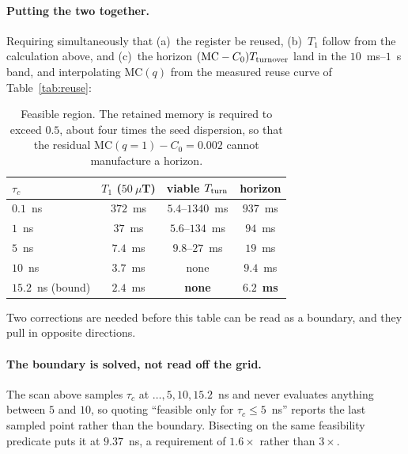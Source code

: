 \documentclass[aps,prx,reprint,superscriptaddress,nofootinbib,floatfix]{revtex4-2}
\begin{document}
\paragraph*{Putting the two together.}
Requiring simultaneously that (a)~the register be reused, (b)~$T_1$ follow from
the calculation above, and (c)~the horizon $(\mathrm{MC}-C_0)T_{\rm turnover}$
land in the $10$~ms--$1$~s band, and interpolating $\mathrm{MC}(q)$ from the
measured reuse curve of Table~\ref{tab:reuse}:

\begin{table}[H]
\caption{\label{tab:feasible}Feasible region. The retained memory is required to
exceed $0.5$, about four times the seed dispersion, so that the residual
$\mathrm{MC}(q{=}1)-C_0=0.002$ cannot manufacture a horizon.}
\begin{ruledtabular}
\begin{tabular}{lccc}
$\tau_c$ & $T_1$ ($50~\mu$T) & viable $T_{\rm turn}$ & horizon \\
\hline
$0.1$~ns & $372$~ms & $5.4$--$1340$~ms & $937$~ms \\
$1$~ns & $37$~ms & $5.6$--$134$~ms & $94$~ms \\
$5$~ns & $7.4$~ms & $9.8$--$27$~ms & $19$~ms \\
$10$~ns & $3.7$~ms & none & $9.4$~ms \\
$15.2$~ns (bound) & $2.4$~ms & \textbf{none} & $\mathbf{6.2}$~\textbf{ms} \\
\end{tabular}
\end{ruledtabular}
\end{table}

Two corrections are needed before this table can be read as a boundary, and they
pull in opposite directions.

\paragraph*{The boundary is solved, not read off the grid.} The scan above
samples $\tau_c$ at $\ldots,5,10,15.2$~ns and never evaluates anything between $5$
and $10$, so quoting ``feasible only for $\tau_c\le5$~ns'' reports the last
sampled point rather than the boundary. Bisecting on the same feasibility
predicate puts it at $9.37$~ns, a requirement of $1.6\times$ rather than
$3\times$.
\end{document}
